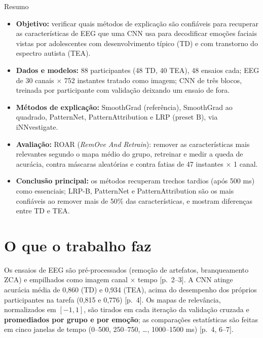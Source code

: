 \documentclass[11pt,a4paper]{article}
\begin{document}
\begin{infobox}[note]{Resumo}
\begin{itemize}
\item \textbf{Objetivo:} verificar quais métodos de explicação são confiáveis para recuperar as características de EEG que uma CNN usa para decodificar emoções faciais vistas por adolescentes com desenvolvimento típico (TD) e com transtorno do espectro autista (TEA).
\item \textbf{Dados e modelos:} 88 participantes (48 TD, 40 TEA), 48 ensaios cada; EEG de 30 canais $\times$ 752 instantes tratado como imagem; CNN de três blocos, treinada por participante com validação deixando um ensaio de fora.
\item \textbf{Métodos de explicação:} SmoothGrad (referência), SmoothGrad ao quadrado, PatternNet, PatternAttribution e LRP (preset B), via iNNvestigate.
\item \textbf{Avaliação:} ROAR (\textit{RemOve And Retrain}): remover as características mais relevantes segundo o mapa médio do grupo, retreinar e medir a queda de acurácia, contra máscaras aleatórias e contra fatias de 47 instantes $\times$ 1 canal.
\item \textbf{Conclusão principal:} os métodos recuperam trechos tardios (após 500 ms) como essenciais; LRP-B, PatternNet e PatternAttribution são os mais confiáveis ao remover mais de 50\% das características, e mostram diferenças entre TD e TEA.
\end{itemize}
\end{infobox}

\section{O que o trabalho faz}
Os ensaios de EEG são pré-processados (remoção de artefatos, branqueamento ZCA) e empilhados como imagem canal $\times$ tempo [p.~2--3]. A CNN atinge acurácia média de 0,860 (TD) e 0,934 (TEA), acima do desempenho dos próprios participantes na tarefa (0,815 e 0,776) [p.~4]. Os mapas de relevância, normalizados em $[-1,1]$, são tirados em cada iteração da validação cruzada e \textbf{promediados por grupo e por emoção}; as comparações estatísticas são feitas em cinco janelas de tempo (0--500, 250--750, \dots, 1000--1500 ms) [p.~4, 6--7].
\end{document}
